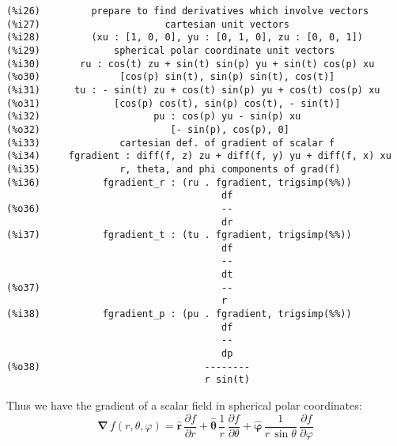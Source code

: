\documentclass[12pt]{article}
\begin{document}
\small
\begin{verbatim}
(%i26)         prepare to find derivatives which involve vectors 
(%i27)                      cartesian unit vectors 
(%i28)         (xu : [1, 0, 0], yu : [0, 1, 0], zu : [0, 0, 1])
(%i29)             spherical polar coordinate unit vectors  
(%i30)       ru : cos(t) zu + sin(t) sin(p) yu + sin(t) cos(p) xu
(%o30)              [cos(p) sin(t), sin(p) sin(t), cos(t)]
(%i31)      tu : - sin(t) zu + cos(t) sin(p) yu + cos(t) cos(p) xu
(%o31)             [cos(p) cos(t), sin(p) cos(t), - sin(t)]
(%i32)                    pu : cos(p) yu - sin(p) xu
(%o32)                       [- sin(p), cos(p), 0]
(%i33)              cartesian def. of gradient of scalar f 
(%i34)     fgradient : diff(f, z) zu + diff(f, y) yu + diff(f, x) xu
(%i35)              r, theta, and phi components of grad(f) 
(%i36)           fgradient_r : (ru . fgradient, trigsimp(%%))
                                      df
(%o36)                                --
                                      dr
(%i37)           fgradient_t : (tu . fgradient, trigsimp(%%))
                                      df
                                      --
                                      dt
(%o37)                                --
                                      r
(%i38)           fgradient_p : (pu . fgradient, trigsimp(%%))
                                      df
                                      --
                                      dp
(%o38)                             --------
                                   r sin(t)
\end{verbatim}
\normalsize
Thus we have the gradient of a scalar field in spherical polar coordinates:
\begin{equation}
\boldsymbol{\nabla} \, f(r,\theta,\varphi ) = 
  \mathbf{\hat{r}}\, \frac{\partial f}{\partial r} +
   \boldsymbol{\hat{\theta}} \, \frac{1}{r} \, \frac{\partial f}{\partial \theta} +
   \boldsymbol{\hat{\varphi}} \, \frac{1}{r \,\sin\theta} \, \frac{\partial f}{\partial \varphi}   
\end{equation}
\end{document}
